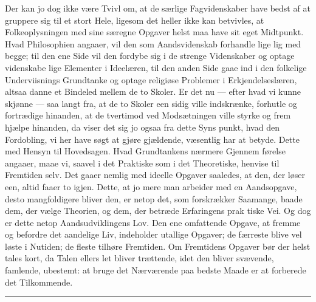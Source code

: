 \documentclass[12pt]{book}
\newcommand{\opage}[1]{\marginnote{\footnotesize\textit{[#1]}}}
\begin{document}
Der kan jo dog ikke være Tvivl om, at de særlige
Fagvidenskaber have bedst af at gruppere sig til et
stort Hele, ligesom det heller ikke kan betvivles, at
Folkeoplysningen med sine særegne Opgaver helst
maa have sit eget Midtpunkt. Hvad Philosophien
angaaer, vil den som Aandsvidenskab forhandle lige\-%
lig med begge; til den ene Side vil den fordybe
sig i de strenge Videnskaber og optage videnskabe\-%
lige Elementer i Ideelæren, til den anden Side gaae ind
i den folkelige Underviisnings Grundtanke og optage
religiøse Problemer i Erkjendelseslæren, altsaa danne et
Bindeled mellem de to Skoler. Er det nu --- efter hvad
vi kunne skjønne --- saa langt fra, at de to Skoler een\-%
sidig ville indskrænke, forhutle og fortrædige hinanden,
at de tvertimod ved Modsætningen ville styrke og frem\-%
hjælpe hinanden, da viser det sig jo ogsaa fra dette Syns\-%
punkt, hvad den Fordobling, vi her have søgt at gjøre
gjældende, væsentlig har at betyde. Dette med Hensyn
\opage{294}\setcounter{footnote}{0}%
til Hovedsagen. Hvad Grundtankens nærmere Gjennem\-%
førelse angaaer, maae vi, saavel i det Praktiske som i
det Theoretiske, henvise til Fremtiden selv. Det gaaer
nemlig med ideelle Opgaver saaledes, at den, der løser
een, altid faaer to igjen. Dette, at jo mere man arbeider
med en Aandsopgave, desto mangfoldigere bliver den,
er netop det, som forskrækker Saamange, baade dem, der
vælge Theorien, og dem, der betræde Erfaringens prak\-%
tiske Vei. Og dog er dette netop Aandsudviklingens Lov.
Den ene omfattende Opgave, at fremme og befordre det
aandelige Liv, indeholder utallige Opgaver; de færreste
blive vel løste i Nutiden; de fleste tilhøre Fremtiden.
Om Fremtidens Opgaver bør der helst tales kort, da
Talen ellers let bliver trættende, idet den bliver svævende,
famlende, ubestemt: at bruge det Nærværende paa bedste
Maade er at forberede det Tilkommende.

\begin{center}\rule{3cm}{0.4pt}\end{center}
\end{document}

